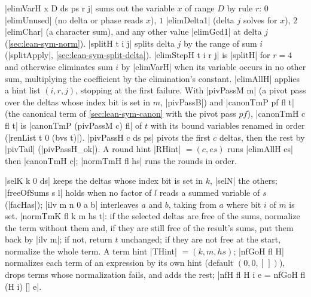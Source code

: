 \begin{definition}\label{def:lean-sym-elimH}
\lean|elimVarH x D ds ps r j| sums out the variable $x$ of range $D$ by rule $r$: $0$ \lean|elimUnused| (no delta or phase reads $x$), $1$ \lean|elimDelta1| (delta $j$ solves for $x$), $2$ \lean|elimChar| (a character sum), and any other value \lean|elimGcd1| at delta $j$ (\cref{sec:lean-sym-norm}). \lean|splitH t i j| splits delta $j$ by the range of sum $i$ (\lean|splitApply|, \cref{sec:lean-sym-split-delta}). \lean|elimStepH t i r j| is \lean|splitH| for $r=4$ and otherwise eliminates sum $i$ by \lean|elimVarH| when its variable occurs in no other sum, multiplying the coefficient by the elimination's constant. \lean|elimAllH| applies a hint list $(i,r,j)$, stopping at the first failure. With \lean|pivPassM m| (a pivot pass over the deltas whose index bit is set in $m$, \lean|pivPassB|) and \lean|canonTmP pf fl t| (the canonical term of \cref{sec:lean-sym-canon} with the pivot pass $pf$), \lean|canonTmH c fl t| is \lean|canonTmP (pivPassM c) fl| of $t$ with its bound variables renamed in order (\lean|renList t 0 (bvs t)|). \lean|pivPassH c ds ps| pivots the first $c$ deltas, then the rest by \lean|pivTail| (\lean|pivPassH_ok|). A round hint \lean|RHint| $=(c,es)$ runs \lean|elimAllH es| then \lean|canonTmH c|; \lean|normTmH fl hs| runs the rounds in order.
\end{definition}

\begin{definition}\label{def:lean-sym-normTmK}
\lean|selK k 0 ds| keeps the deltas whose index bit is set in $k$, \lean|selN| the others; \lean|freeOfSums s l| holds when no factor of $l$ reads a summed variable of $s$ (\lean|facHas|); \lean|ilv m n 0 a b| interleaves $a$ and $b$, taking from $a$ where bit $i$ of $m$ is set. \lean|normTmK fl k m hs t|: if the selected deltas are free of the sums, normalize the term without them and, if they are still free of the result's sums, put them back by \lean|ilv m|; if not, return $t$ unchanged; if they are not free at the start, normalize the whole term. A term hint \lean|THint| $=(k,m,hs)$; \lean|nfGoH fl H| normalizes each term of an expression by its own hint (default $(0,0,[\,])$), drops terms whose normalization fails, and adds the rest; \lean|nfH fl H i e = nfGoH fl (H i) [] e|.
\end{definition}

